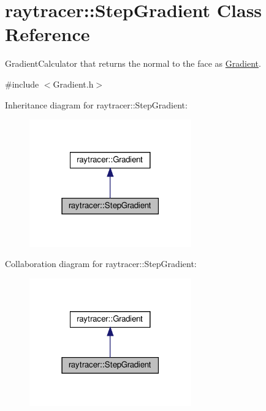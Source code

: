 \hypertarget{classraytracer_1_1StepGradient}{}\section{raytracer\+:\+:Step\+Gradient Class Reference}
\label{classraytracer_1_1StepGradient}


Gradient\+Calculator that returns the normal to the face as \hyperlink{classraytracer_1_1Gradient}{Gradient}.  




{\ttfamily \#include $<$Gradient.\+h$>$}



Inheritance diagram for raytracer\+:\+:Step\+Gradient\+:
\nopagebreak
\begin{figure}[H]
\begin{center}
\leavevmode
\includegraphics[width=198pt]{classraytracer_1_1StepGradient__inherit__graph}
\end{center}
\end{figure}


Collaboration diagram for raytracer\+:\+:Step\+Gradient\+:
\nopagebreak
\begin{figure}[H]
\begin{center}
\leavevmode
\includegraphics[width=198pt]{classraytracer_1_1StepGradient__coll__graph}
\end{center}
\end{figure}
